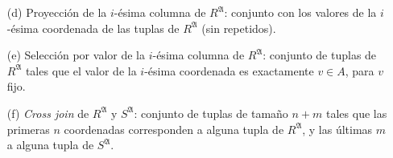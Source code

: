 \begin{enumerate}
	\item[(d)] Proyección de la $i$-ésima columna de $R^\mathfrak{A}$: conjunto con los valores de la $i$-ésima coordenada de las tuplas de $R^\mathfrak{A}$ (sin repetidos).
	\item[(e)] Selección por valor de la $i$-ésima columna de $R^\mathfrak{A}$: conjunto de tuplas de $R^\mathfrak{A}$ tales que el valor de la $i$-ésima coordenada es exactamente $v\in A$, para $v$ fijo.
	\item[(f)] \textit{Cross join} de $R^\mathfrak{A}$ y $S^\mathfrak{A}$: conjunto de tuplas de tamaño $n+m$ tales que las primeras $n$ coordenadas corresponden a alguna tupla de $R^\mathfrak{A}$, y las últimas $m$ a alguna tupla de $S^\mathfrak{A}$.
\end{enumerate}
